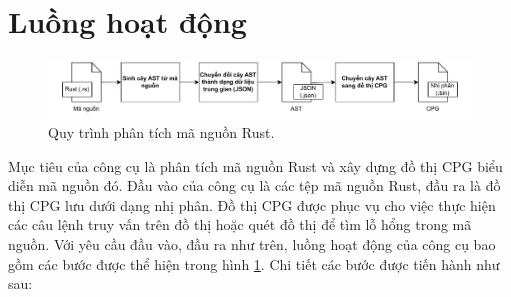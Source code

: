 \section{Luồng hoạt động}

\begin{figure}[H]
	\includegraphics[width=1\columnwidth]{figures/c3/c3_flow_2.drawio.pdf}
	\centering
	\caption{Quy trình phân tích mã nguồn Rust.}
	\label{img:c3_flow_2}
\end{figure}




Mục tiêu của công cụ là phân tích mã nguồn Rust và xây dựng đồ thị CPG biểu diễn mã nguồn đó.
Đầu vào của công cụ là các tệp mã nguồn Rust, đầu ra là đồ thị CPG lưu dưới dạng nhị phân.
Đồ thị CPG được phục vụ cho việc thực hiện các câu lệnh truy vấn trên đồ thị hoặc quét đồ thị để tìm lỗ hổng trong mã nguồn.
Với yêu cầu đầu vào, đầu ra như trên, luồng hoạt động của công cụ bao gồm các bước được thể hiện trong hình \ref{img:c3_flow_2}.
Chi tiết các bước được tiến hành như sau:

